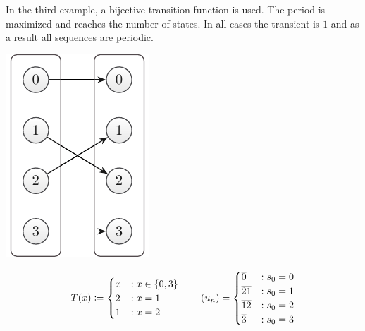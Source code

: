 \documentclass{stdlocal}
\begin{document}
  \noindent
  In the third example, a bijective transition function is used.
  The period is maximized and reaches the number of states.
  In all cases the transient is $1$ and as a result all sequences are periodic.

  \medskip
  \begin{minipage}{0.2\textwidth}
    \includegraphics[width=\textwidth]{figures/periodicity_example_d.pdf}
  \end{minipage}
  \hfill
  \begin{minipage}{0.73\textwidth}
    \[
      T(x) \define
      \begin{cases}
        x &: x \in \set{0,3}{} \\
        2 &: x = 1 \\
        1 &: x = 2
      \end{cases}
    \separate
      (u_n) =
      \begin{cases}
        \overline{0} &: s_0 = 0 \\
        \overline{21} &: s_0 = 1 \\
        \overline{12} &: s_0 = 2 \\
        \overline{3} &: s_0 = 3
      \end{cases}
    \]
  \end{minipage}
  \medskip
\end{document}
